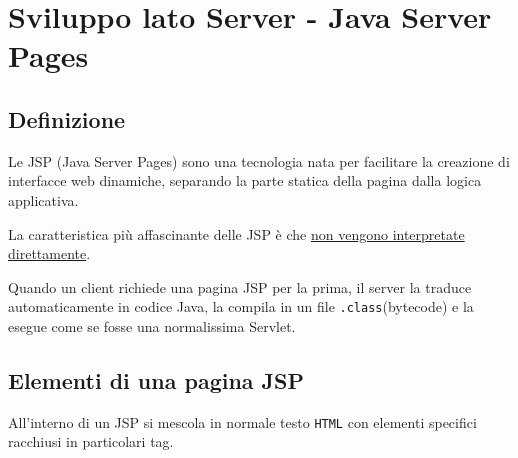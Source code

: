\chapter{Sviluppo lato Server - Java Server Pages}
\section{Definizione}
Le JSP (Java Server Pages) sono una tecnologia nata per facilitare la creazione di interfacce web dinamiche, separando la parte statica della pagina dalla logica applicativa.

La caratteristica più affascinante delle JSP è che \uline{non vengono interpretate direttamente}.

Quando un client richiede una pagina JSP per la prima, il server la traduce automaticamente in codice Java, la compila in un file \texttt{.class}(bytecode) e la esegue come se fosse una normalissima Servlet.

\section{Elementi di una pagina JSP}
All'interno di un JSP si mescola in normale testo \texttt{HTML} con elementi specifici racchiusi in particolari tag.


